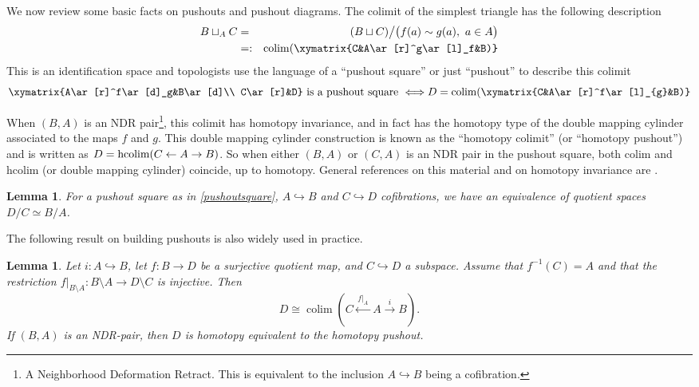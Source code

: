 \documentclass[11pt,a4paper]{article}
\numberwithin{equation}{section}
\newtheorem{lem}[thm]{Lemma}
\theoremstyle{definition}
\theoremstyle{remark}
\newcommand{\colim}{\operatorname*{colim}}
\begin{document}
We now review some basic facts on pushouts and pushout diagrams. The colimit of the simplest triangle has the following description
\begin{eqnarray*}B\sqcup_AC &=&  (B\sqcup C)\big/\bigl(f(a)\sim g(a),\ a\in A\bigr) \\
&=:&\colim(\xymatrix{C&A\ar[r]^g\ar[l]_f&B)}
\end{eqnarray*}
This is an identification space and topologists use the language of a ``pushout square'' or just ``pushout'' to describe this colimit
\begin{equation}\label{pushoutsquare}\xymatrix{A\ar[r]^f\ar[d]_g&B\ar[d]\\
C\ar[r]&D} \ \hbox{is a pushout square}\ \Longleftrightarrow D=\colim (\xymatrix{C&A\ar[r]^f\ar[l]_{g}&B)}
\end{equation}

When $(B,A)$ is an NDR pair\footnote{A Neighborhood Deformation Retract. This is equivalent to the inclusion $A\hookrightarrow B$ being a cofibration.}, this colimit has homotopy invariance, and in fact has the homotopy type of the double mapping cylinder associated to the maps $f$ and $g$. This double mapping cylinder construction is known as the ``homotopy colimit'' (or ``homotopy pushout'') and is written as $D=\hbox{hcolim}(C\leftarrow A\rightarrow B)$. So when either $(B,A)$ or $(C,A)$ is an NDR pair in the pushout square, both colim and hcolim (or double mapping cylinder) coincide, up to homotopy. General references on this material and on homotopy invariance are \cite{piacenza, Strom2011}. 

\begin{lem}\label{equivalencequotients} For a pushout square as in \eqref{pushoutsquare}, $A\hookrightarrow B$ and $C\hookrightarrow D$ cofibrations, we have an equivalence of quotient spaces
$\displaystyle D/C \simeq B/A$.
\end{lem}

The following result on building pushouts is also widely used in practice.

\begin{lem}\label{pushoutmethod}  Let \(i: A\hookrightarrow B\), let $f\colon B\longrightarrow D$ be a surjective quotient map, and $C\hookrightarrow D$ a subspace. Assume that $f^{-1}(C)=A$ and that the restriction $ f|_{B\setminus A}\colon B\setminus A\longrightarrow D\setminus C $ is injective. Then \[ D\cong \operatorname*{colim} \left( C\xleftarrow{\,f|_A\,}A\xrightarrow{\,i\,}B \right). \]
If $(B,A)$ is an NDR-pair, then $D$ is homotopy equivalent to the homotopy pushout.
\end{lem}
\end{document}
